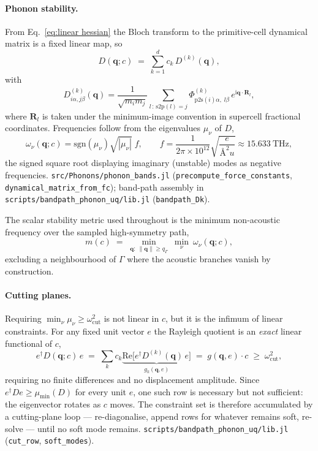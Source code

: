 \documentclass{article}
\newcommand{\code}[1]{\texttt{\small #1}}
\begin{document}
\paragraph{Phonon stability.}
From Eq.~\eqref{eq:linear hessian} the Bloch transform to the primitive-cell
dynamical matrix is a fixed linear map, so
\begin{equation}
  D(\bm q;c) \;=\; \sum_{k=1}^{d} c_k\, D^{(k)}(\bm q),
  \label{eq:D linear}
\end{equation}
with
\begin{equation}
  D^{(k)}_{i\alpha,j\beta}(\bm q)
  = \frac{1}{\sqrt{m_i m_j}}
    \sum_{l\,:\,\mathrm{s2p}(l)=j}
    \Phi^{(k)}_{\mathrm{p2s}(i)\alpha,\;l\beta}\,
    e^{\mathrm{i}\bm q\cdot \bm R_l},
  \label{eq:bloch}
\end{equation}
where $\bm R_l$ is taken under the minimum-image convention in supercell
fractional coordinates. Frequencies follow from the eigenvalues $\mu_\nu$ of $D$,
\begin{equation}
  \omega_\nu(\bm q;c) = \mathrm{sgn}(\mu_\nu)\sqrt{|\mu_\nu|}\;f,
  \qquad f = \frac{1}{2\pi\times10^{12}}\sqrt{\frac{e}{\text{\AA}^{2}u}} \approx 15.633~\mathrm{THz},
  \label{eq:freq}
\end{equation}
the signed square root displaying imaginary (unstable) modes as negative
frequencies. \code{src/Phonons/phonon\_bands.jl}
(\code{precompute\_force\_constants}, \code{dynamical\_matrix\_from\_fc});
band-path assembly in \code{scripts/bandpath\_phonon\_uq/lib.jl}
(\code{bandpath\_Dk}).

The scalar stability metric used throughout is the minimum non-acoustic
frequency over the sampled high-symmetry path,
\begin{equation}
  m(c) \;=\; \min_{\bm q:\ \|\bm q\| \ge q_\Gamma}\ \min_\nu\ \omega_\nu(\bm q;c),
  \label{eq:minfreq}
\end{equation}
excluding a neighbourhood of $\Gamma$ where the acoustic branches vanish by
construction.

\paragraph{Cutting planes.}
Requiring $\min_\nu\mu_\nu \ge \omega_{\mathrm{cut}}^{2}$ is not linear in $c$,
but it is the infimum of linear constraints. For any fixed unit vector $e$ the
Rayleigh quotient is an \emph{exact} linear functional of $c$,
\begin{equation}
  e^{\dagger} D(\bm q;c)\, e
  \;=\; \sum_k c_k \underbrace{\mathrm{Re}\bigl[e^{\dagger} D^{(k)}(\bm q)\,e\bigr]}_{g_k(\bm q,e)}
  \;=\; g(\bm q,e)\cdot c \;\ge\; \omega_{\mathrm{cut}}^{2},
  \label{eq:cut row}
\end{equation}
requiring no finite differences and no displacement amplitude. Since
$e^{\dagger}De \ge \mu_{\min}(D)$ for every unit $e$, one such row is necessary
but not sufficient: the eigenvector rotates as $c$ moves. The constraint set is
therefore accumulated by a cutting-plane loop --- re-diagonalise, append rows for
whatever remains soft, re-solve --- until no soft mode remains.
\code{scripts/bandpath\_phonon\_uq/lib.jl}
(\code{cut\_row}, \code{soft\_modes}).
\end{document}
